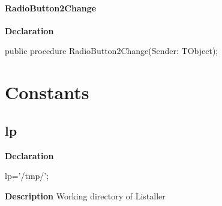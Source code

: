 \documentclass{report}
\newif\ifpdf
\begin{document}
\paragraph*{RadioButton2Change}\hspace*{\fill}

\label{mainunit.TIWizFrm-RadioButton2Change}
\begin{list}{}{
\setlength{\itemindent}{0cm}
\setlength{\listparindent}{0cm}
\setlength{\leftmargin}{\evensidemargin}
\addtolength{\leftmargin}{\tmplength}
\settowidth{\labelsep}{X}
\addtolength{\leftmargin}{\labelsep}
\setlength{\labelwidth}{\tmplength}
}
\item[\textbf{Declaration}\hfill]
\ifpdf
\begin{flushleft}
\fi
\begin{ttfamily}
public procedure RadioButton2Change(Sender: TObject);\end{ttfamily}

\ifpdf
\end{flushleft}
\fi

\end{list}
\section{Constants}
\ifpdf
\subsection*{\large{\textbf{lp}}\normalsize\hspace{1ex}\hrulefill}
\else
\subsection*{lp}
\fi
\label{mainunit-lp}
\begin{list}{}{
\setlength{\itemindent}{0cm}
\setlength{\listparindent}{0cm}
\setlength{\leftmargin}{\evensidemargin}
\addtolength{\leftmargin}{\tmplength}
\settowidth{\labelsep}{X}
\addtolength{\leftmargin}{\labelsep}
\setlength{\labelwidth}{\tmplength}
}
\item[\textbf{Declaration}\hfill]
\ifpdf
\begin{flushleft}
\fi
\begin{ttfamily}
lp='/tmp/';\end{ttfamily}

\ifpdf
\end{flushleft}
\fi

\par
\item[\textbf{Description}]
Working directory of Listaller

\end{list}
\end{document}
